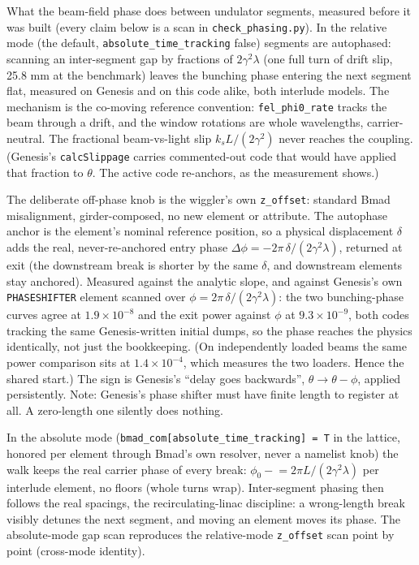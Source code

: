 \documentclass[11pt]{article}
\newcommand{\code}[1]{\texttt{#1}}
\begin{document}
What the beam-field phase does between undulator segments, measured before it was
built (every claim below is a scan in \code{check\_phasing.py}). In the relative
mode (the default, \code{absolute\_time\_tracking} false) segments are
autophased: scanning an inter-segment gap by fractions of $2\gamma^2\lambda$ (one
full turn of drift slip, 25.8 mm at the benchmark) leaves the
bunching phase entering the next segment flat, measured on Genesis and on this code
alike, both interlude models. The mechanism is the co-moving reference convention:
\code{fel\_phi0\_rate} tracks the beam through a drift, and the window rotations are
whole wavelengths, carrier-neutral. The fractional beam-vs-light slip
$k_s L/(2\gamma^2)$ never reaches the coupling. (Genesis's \code{calcSlippage}
carries commented-out code that would have applied that fraction to $\theta$.
The active code re-anchors, as the measurement shows.)

The deliberate off-phase knob is the wiggler's own \code{z\_offset}: standard
Bmad misalignment, girder-composed, no new element or attribute. The autophase
anchor is the element's nominal reference position, so a physical displacement
$\delta$ adds the real, never-re-anchored entry phase
$\Delta\phi = -2\pi\,\delta/(2\gamma^2\lambda)$, returned at exit (the downstream
break is shorter by the same $\delta$, and downstream elements stay anchored). Measured
against the analytic slope, and against Genesis's own
\code{PHASESHIFTER} element scanned over $\phi = 2\pi\,\delta/(2\gamma^2\lambda)$:
the two bunching-phase curves agree at $1.9\times10^{-8}$ and the exit power against
$\phi$ at $9.3\times10^{-9}$, both codes tracking the same Genesis-written initial
dumps, so the phase reaches the physics identically, not just the bookkeeping. (On
independently loaded beams the same power comparison sits at $1.4\times10^{-4}$,
which measures the two loaders. Hence the shared start.) The sign is Genesis's
``delay goes backwards'', $\theta \to \theta - \phi$, applied persistently.
Note: Genesis's phase shifter must have finite length to register at all. A
zero-length one silently does nothing.

In the absolute mode (\code{bmad\_com[absolute\_time\_tracking] = T} in the
lattice, honored per element through Bmad's own resolver, never a namelist knob)
the walk keeps the real carrier phase of every break:
$\phi_0 \mathrel{-}= 2\pi L/(2\gamma^2\lambda)$ per interlude element, no floors
(whole turns wrap). Inter-segment phasing then follows the real spacings, the
recirculating-linac discipline: a wrong-length break visibly detunes the next
segment, and moving an element moves its phase. The absolute-mode gap scan
reproduces the relative-mode \code{z\_offset} scan point by point (cross-mode
identity).
\end{document}
